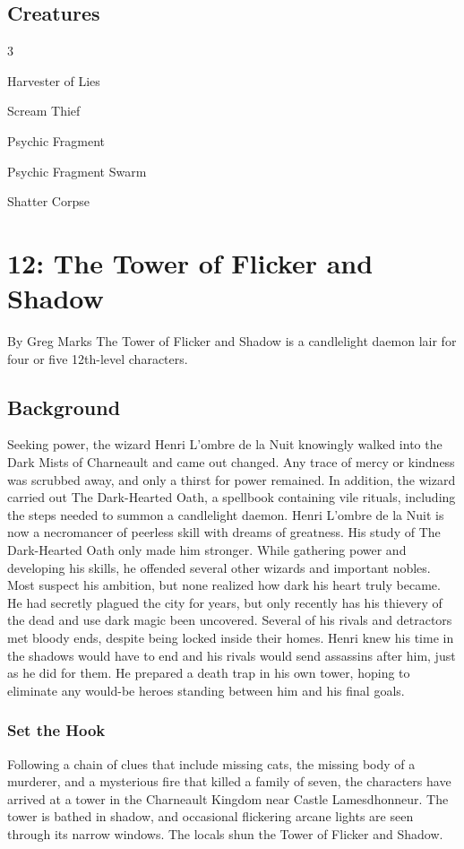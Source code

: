 \documentclass[10pt,a4paper,twoside,twocolumn,openany,bg=print,nodeprecatedcode]{dndbook}
\begin{document}
\section{Creatures}

\begin{itemize}
\begin{multicols}{3}
\item Harvester of Lies
\item Scream Thief
\item Psychic Fragment
\item Psychic Fragment Swarm
\item Shatter Corpse
\end{multicols}

\end{itemize}

\chapter{12: The Tower of Flicker and Shadow}
By Greg Marks
The Tower of Flicker and Shadow is a candlelight daemon lair for four or five 12th-level characters.
\section{Background}
Seeking power, the wizard Henri L'ombre de la Nuit knowingly walked into the Dark Mists of Charneault and came out changed. Any trace of mercy or kindness was scrubbed away, and only a thirst for power remained. In addition, the wizard carried out The Dark-Hearted Oath, a spellbook containing vile rituals, including the steps needed to summon a candlelight daemon.
Henri L'ombre de la Nuit is now a necromancer of peerless skill with dreams of greatness. His study of The Dark-Hearted Oath only made him stronger. While gathering power and developing his skills, he offended several other wizards and important nobles. Most suspect his ambition, but none realized how dark his heart truly became. He had secretly plagued the city for years, but only recently has his thievery of the dead and use dark magic been uncovered. Several of his rivals and detractors met bloody ends, despite being locked inside their homes. Henri knew his time in the shadows would have to end and his rivals would send assassins after him, just as he did for them. He prepared a death trap in his own tower, hoping to eliminate any would-be heroes standing between him and his final goals.
\subsection{Set the Hook}
Following a chain of clues that include missing cats, the missing body of a murderer, and a mysterious fire that killed a family of seven, the characters have arrived at a tower in the Charneault Kingdom near Castle Lamesdhonneur. The tower is bathed in shadow, and occasional flickering arcane lights are seen through its narrow windows. The locals shun the Tower of Flicker and Shadow.
\end{document}
